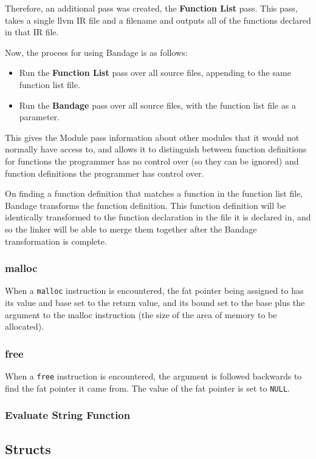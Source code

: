 Therefore, an additional pass was created, the \textbf{Function List} pass.
This pass, takes a single llvm IR file and a filename and outputs all of the functions declared in that IR file.

Now, the process for using Bandage is as follows:
\begin{itemize}
\item Run the \textbf{Function List} pass over all source files, appending to the same function list file.
\item Run the \textbf{Bandage} pass over all source files, with the function list file as a parameter.
\end{itemize}

This gives the Module pass information about other modules that it would not normally have access to, and allows it to distinguish between function definitions for functions the programmer has no control over (so they can be ignored) and function definitions the programmer has control over.

On finding a function definition that matches a function in the function list file, Bandage transforms the function definition.
This function definition will be identically transformed to the function declaration in the file it is declared in, and so the linker will be able to merge them together after the Bandage transformation is complete.

\subsubsection{malloc}

When a \verb!malloc! instruction is encountered, the fat pointer being assigned to has its value and base set to the return value, and its bound set to the base plus the argument to the malloc instruction (the size of the area of memory to be allocated).

\subsubsection{free}
When a \verb!free! instruction is encountered, the argument is followed backwards to find the fat pointer it came from.
The value of the fat pointer is set to \verb!NULL!.
\subsubsection{Evaluate String Function}

\subsection{Structs}


